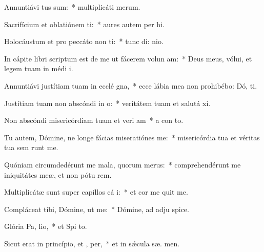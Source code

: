 \item Annuntiávi  tus sum:~* multiplicáti   merum.
\item Sacrifícium et oblatiónem ti:~* aures autem per hi.
\item Holocáustum et pro peccáto non ti:~* tunc di:  nio.
\item In cápite libri scriptum est de me ut fácerem volun am:~* Deus meus, vólui, et legem tuam in médi  i.
\item Annuntiávi justítiam tuam in ecclé gna,~* ecce lábia mea non prohibébo: Dó,  ti.
\item Justítiam tuam non abscóndi in  o:~* veritátem tuam et salutá  xi.
\item Non abscóndi misericórdiam tuam et veri am~* a con to.
\item Tu autem, Dómine, ne longe fácias miseratiónes   me:~* misericórdia tua et véritas tua sem runt me.
\item Quóniam circumdedérunt me mala, quorum   merus:~* comprehendérunt me iniquitátes meæ, et non pótu  rem.
\item Multiplicátæ sunt super capíllos cá i:~* et cor me quit me.
\item Compláceat tibi, Dómine, ut  me:~* Dómine, ad adju  spice.
\item Glória Pa,  lio,~* et Spi to.
\item Sicut erat in princípio, et ,  per,~* et in sǽcula sæ. men.
